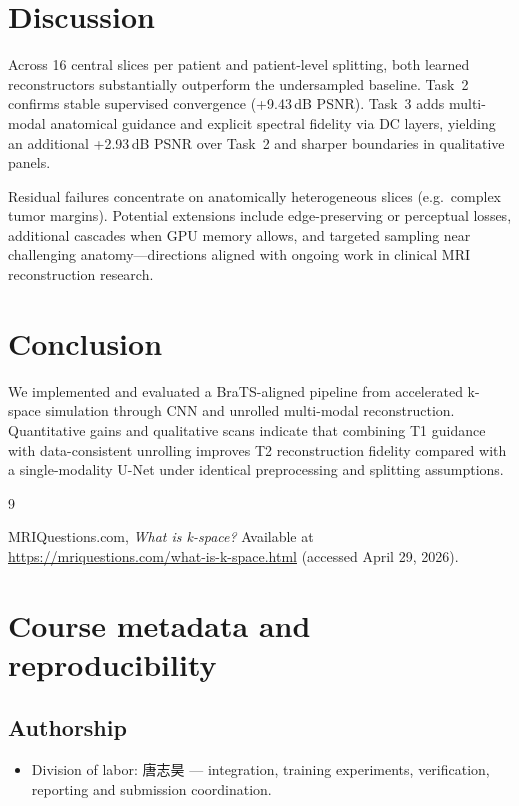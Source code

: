 \documentclass[11pt,a4paper]{article}
\begin{document}
\section{Discussion}
\label{sec:discussion}

Across 16 central slices per patient and patient-level splitting, both learned reconstructors substantially outperform the undersampled baseline. Task~2 confirms stable supervised convergence (+9.43\,dB PSNR). Task~3 adds multi-modal anatomical guidance and explicit spectral fidelity via DC layers, yielding an additional +2.93\,dB PSNR over Task~2 and sharper boundaries in qualitative panels.

Residual failures concentrate on anatomically heterogeneous slices (e.g.\ complex tumor margins). Potential extensions include edge-preserving or perceptual losses, additional cascades when GPU memory allows, and targeted sampling near challenging anatomy---directions aligned with ongoing work in clinical MRI reconstruction research.

\section{Conclusion}
\label{sec:conclusion}

We implemented and evaluated a BraTS-aligned pipeline from accelerated k-space simulation through CNN and unrolled multi-modal reconstruction. Quantitative gains and qualitative scans indicate that combining T1 guidance with data-consistent unrolling improves T2 reconstruction fidelity compared with a single-modality U-Net under identical preprocessing and splitting assumptions.

\begin{thebibliography}{9}

MRIQuestions.com, \textit{What is k-space?} Available at \url{https://mriquestions.com/what-is-k-space.html} (accessed April 29, 2026).

\end{thebibliography}

\section{Course metadata and reproducibility}

\subsection*{Authorship}
\begin{itemize}\setlength\itemsep{0.25em}
\item Division of labor: 唐志昊 --- integration, training experiments, verification, reporting and submission coordination.
\end{itemize}
\end{document}
